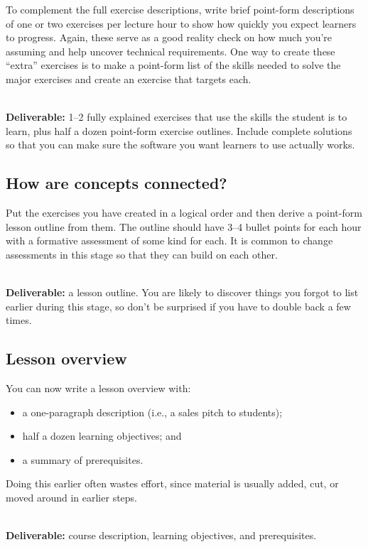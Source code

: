 To complement the full exercise descriptions,
write brief point-form descriptions of one or two exercises per lecture hour
to show how quickly you expect learners to progress.
Again,
these serve as a good reality check on how much you're assuming
and help uncover technical requirements.
One way to create these ``extra'' exercises
is to make a point-form list of the skills needed to solve the major exercises
and create an exercise that targets each.

~\\
\noindent
\textbf{Deliverable:} 1--2 fully explained exercises
that use the skills the student is to learn,
plus half a dozen point-form exercise outlines.
Include complete solutions
so that you can make sure the software you want learners to use actually works.

\subsection*{How are concepts connected?}

Put the exercises you have created in a logical order
and then derive a point-form lesson outline from them.
The outline should have 3--4 bullet points for each hour
with a formative assessment of some kind for each.
It is common to change assessments in this stage
so that they can build on each other.

~\\
\noindent
\textbf{Deliverable:} a lesson outline.
You are likely to discover things you forgot to list earlier during this stage,
so don't be surprised if you have to double back a few times.

\subsection*{Lesson overview}

You can now write a lesson overview with:

\begin{itemize}

\item
  a one-paragraph description (i.e., a sales pitch to students);

\item
  half a dozen learning objectives; and

\item
  a summary of prerequisites.

\end{itemize}

Doing this earlier often wastes effort,
since material is usually added, cut, or moved around in earlier steps.

~\\
\noindent
\textbf{Deliverable:}
course description,
learning objectives,
and prerequisites.
